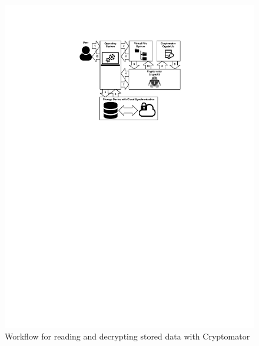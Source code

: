 \documentclass[lang=en]{sjtuarticle}
\begin{document}
\begin{figure}[h]
    \centering
    \begin{minipage}[b]{.45\textwidth}
        \centering
        \includegraphics[width=\textwidth]{cyptomator.pdf}
        \caption{Workflow for reading and decrypting stored data with Cryptomator}
        \label{fig:cryptomator}
    \end{minipage}\hfill
    \begin{minipage}[b]{.45\textwidth}
        \centering

\end{minipage}
\end{figure}
\end{document}
